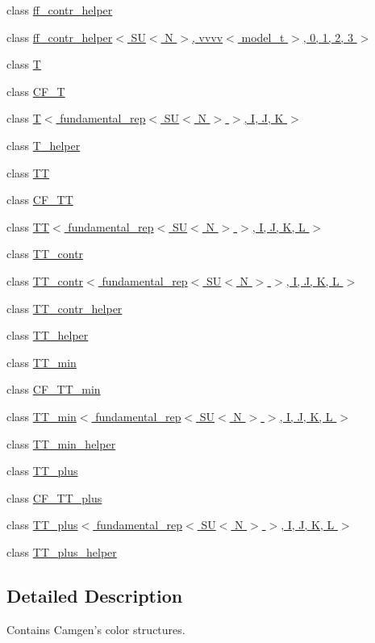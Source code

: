 \begin{DoxyCompactItemize}
class \hyperlink{a00224}{ff\-\_\-contr\-\_\-helper}
\item 
class \hyperlink{a00225}{ff\-\_\-contr\-\_\-helper$<$ S\-U$<$ N $>$, vvvv$<$ model\-\_\-t $>$, 0, 1, 2, 3 $>$}
\item 
class \hyperlink{a00521}{T}
\item 
class \hyperlink{a00040}{C\-F\-\_\-\-T}
\item 
class \hyperlink{a00522}{T$<$ fundamental\-\_\-rep$<$ S\-U$<$ N $>$ $>$, I, J, K $>$}
\item 
class \hyperlink{a00525}{T\-\_\-helper}
\item 
class \hyperlink{a00530}{T\-T}
\item 
class \hyperlink{a00041}{C\-F\-\_\-\-T\-T}
\item 
class \hyperlink{a00531}{T\-T$<$ fundamental\-\_\-rep$<$ S\-U$<$ N $>$ $>$, I, J, K, L $>$}
\item 
class \hyperlink{a00532}{T\-T\-\_\-contr}
\item 
class \hyperlink{a00533}{T\-T\-\_\-contr$<$ fundamental\-\_\-rep$<$ S\-U$<$ N $>$ $>$, I, J, K, L $>$}
\item 
class \hyperlink{a00534}{T\-T\-\_\-contr\-\_\-helper}
\item 
class \hyperlink{a00535}{T\-T\-\_\-helper}
\item 
class \hyperlink{a00536}{T\-T\-\_\-min}
\item 
class \hyperlink{a00042}{C\-F\-\_\-\-T\-T\-\_\-min}
\item 
class \hyperlink{a00537}{T\-T\-\_\-min$<$ fundamental\-\_\-rep$<$ S\-U$<$ N $>$ $>$, I, J, K, L $>$}
\item 
class \hyperlink{a00538}{T\-T\-\_\-min\-\_\-helper}
\item 
class \hyperlink{a00539}{T\-T\-\_\-plus}
\item 
class \hyperlink{a00043}{C\-F\-\_\-\-T\-T\-\_\-plus}
\item 
class \hyperlink{a00540}{T\-T\-\_\-plus$<$ fundamental\-\_\-rep$<$ S\-U$<$ N $>$ $>$, I, J, K, L $>$}
\item 
class \hyperlink{a00541}{T\-T\-\_\-plus\-\_\-helper}
\end{DoxyCompactItemize}


\subsection{Detailed Description}
Contains Camgen's color structures. 